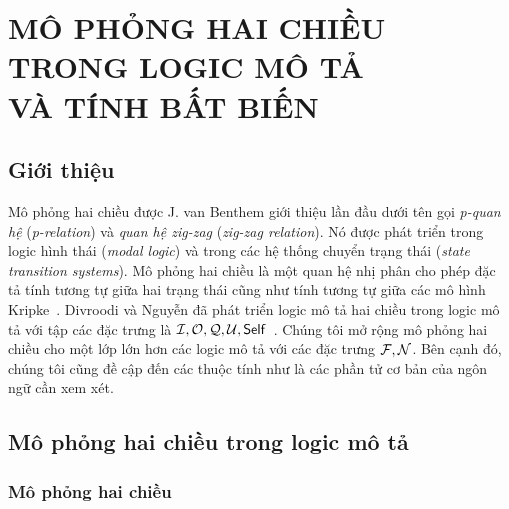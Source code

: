 \chapter[Mô phỏng hai chiều trong logic mô tả và tính bất biến]{MÔ PHỎNG HAI CHIỀU TRONG LOGIC MÔ TẢ\\ VÀ TÍNH BẤT BIẾN}
\label{Chapter2}
\thispagestyle{fancy}

\section{Giới thiệu}
\label{sec:Chap2.Introduction}
Mô phỏng hai chiều được J. van Benthem giới thiệu lần đầu dưới tên gọi {\em p-quan hệ} ({\em p-relation}) và {\em quan hệ zig-zag} ({\em zig-zag relation}). Nó được phát triển trong logic hình thái ({\em modal logic}) và trong các hệ thống chuyển trạng thái ({\em state transition systems}). 
Mô phỏng hai chiều là một quan hệ nhị phân cho phép đặc tả tính tương tự giữa hai trạng thái cũng như tính tương tự giữa các mô hình Kripke~\cite{Benthem1984,Benthem2010,Benthem2001,Blackburn2001}. Divroodi và Nguyễn đã phát triển logic mô tả hai chiều trong logic mô tả \ALCreg với tập các đặc trưng là $\mathcal{I}, \mathcal{O}, \mathcal{Q}, \mathcal{U}, \mathsf{Self}$~\cite{Divroodi2011B}. Chúng tôi mở rộng mô phỏng hai chiều cho một lớp lớn hơn các logic mô tả với các đặc trưng $\mathcal{F}, \mathcal{N}$. Bên cạnh đó, chúng tôi cũng đề cập đến các thuộc tính như là các phần tử cơ bản của ngôn ngữ cần xem xét.
\section{Mô phỏng hai chiều trong logic mô tả}
\label{sec:Chap2.BisimulationInDL}
\subsection{Mô phỏng hai chiều}
\label{sec:Chap2.Bisimulation}

